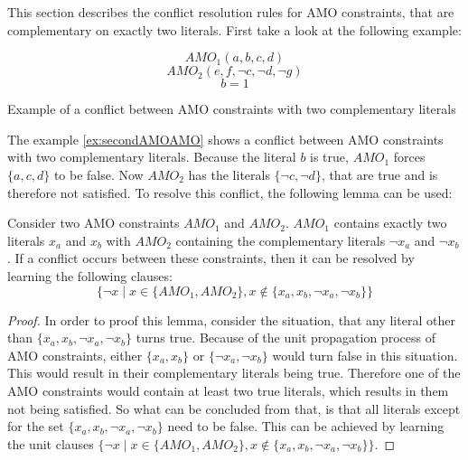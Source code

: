 This section describes the conflict resolution rules for AMO constraints, that are complementary on exactly two literals. First take a look at the following example:
\begin{example}[H]
\begin{leftbar}
\begin{displaymath}
AMO_1(a,b,c,d)
\end{displaymath}
\begin{displaymath}
AMO_2(e,f,\neg c,\neg d, \neg g)
\end{displaymath}
\begin{displaymath}
b = 1
\end{displaymath}
\end{leftbar}
\caption{Example of a conflict between AMO constraints with two complementary literals}
\label{ex:secondAMOAMO}
\end{example}
The example \ref{ex:secondAMOAMO} shows a conflict between AMO constraints with two complementary literals. Because the literal $b$ is true, $AMO_1$ forces $\{a,c,d\}$ to be false. Now $AMO_2$ has the literals $\{\neg c,\neg d\}$, that are true and is therefore not satisfied. To resolve this conflict, the following lemma can be used:

\begin{lemma}
\begin{leftbar}
Consider two AMO constraints $AMO_1$ and $AMO_2$. $AMO_1$ contains exactly two literals $x_a$ and $x_b$ with $AMO_2$ containing the complementary literals $\neg x_a$ and $\neg x_b$.
If a conflict occurs between these constraints, then it can be resolved by learning the following clauses:
\begin{displaymath}
\{\neg x \; | \; x \in \{AMO_1,AMO_2\}, x \notin \{x_a,x_b,\neg x_a, \neg x_b\}\}
\end{displaymath}
\end{leftbar}
\label{le:twoComplementary}
\end{lemma}

\begin{proof}
In order to proof this lemma, consider the situation, that any literal other than \newline $\{x_a, x_b, \neg x_a, \neg x_b\}$ turns true. Because of the unit propagation process of AMO constraints, either $\{x_a, x_b\}$ or $\{\neg x_a, \neg x_b\}$ would turn false in this situation. This would result in their complementary literals being true. Therefore one of the AMO constraints would contain at least two true literals, which results in them not being satisfied. So what can be concluded from that, is that all literals except for the set $\{x_a, x_b, \neg x_a, \neg x_b\}$ need to be false. This can be achieved by learning the unit clauses $\{\neg x \; | \; x \in \{AMO_1,AMO_2\}, x \notin \{x_a,x_b, \neg x_a, \neg x_b\}\}$.
\end{proof}

